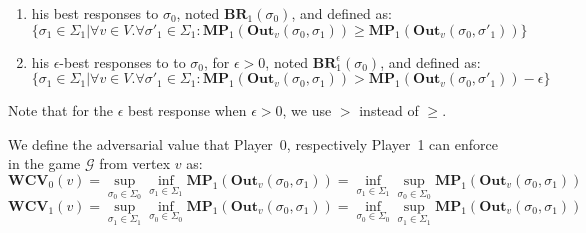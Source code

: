\begin{enumerate}
\item 
his best responses to $\sigma_0$, noted $\mathbf{BR}_1(\sigma_0)$, and defined as:
\begin{equation*}
    \{\sigma_1 \in \Sigma_1 | \forall v \in V . \forall \sigma'_1 \in \Sigma _1: \mathbf{MP}_1(\mathbf{Out}_v(\sigma_0,\sigma_1)) \geqslant \mathbf{MP}_1(\mathbf{Out}_v(\sigma_0,\sigma'_1))\}
\end{equation*}

\item \label{epsion_gt_0}
his $\epsilon$-best responses to to $\sigma_0$, for $\epsilon > 0$, noted $\mathbf{BR}^{\epsilon}_1(\sigma_0)$, and defined as:
\begin{equation*}
    \{\sigma_1 \in \Sigma_1 | \forall v \in V . \forall \sigma'_1 \in \Sigma _1: \mathbf{MP}_1(\mathbf{Out}_v(\sigma_0,\sigma_1)) > \mathbf{MP}_1(\mathbf{Out}_v(\sigma_0,\sigma'_1)) - \epsilon\}
\end{equation*}
\end{enumerate}
Note that for the $\epsilon$ best response when $\epsilon > 0$, we use $>$ instead of $\geqslant$.

We define the adversarial value that Player~0, respectively Player~1 can enforce in the game $\mathcal{G}$ from vertex $v$ as:
\begin{equation*}
    \mathbf{WCV}_0(v) = \sup\limits_{\sigma_0 \in \Sigma_0} \inf\limits_{\sigma_1 \in \Sigma_1} \mathbf{MP}_1(\mathbf{Out}_v(\sigma_0,\sigma_1)) = \inf\limits_{\sigma_1 \in \Sigma_1} \sup\limits_{\sigma_0 \in \Sigma_0} \mathbf{MP}_1(\mathbf{Out}_v(\sigma_0,\sigma_1))
\end{equation*}
\begin{equation*}
    \mathbf{WCV}_1(v) = \sup\limits_{\sigma_1 \in \Sigma_1} \inf\limits_{\sigma_0 \in \Sigma_0} \mathbf{MP}_1(\mathbf{Out}_v(\sigma_0,\sigma_1)) = \inf\limits_{\sigma_0 \in \Sigma_0} \sup\limits_{\sigma_1 \in \Sigma_1} \mathbf{MP}_1(\mathbf{Out}_v(\sigma_0,\sigma_1))
\end{equation*}


